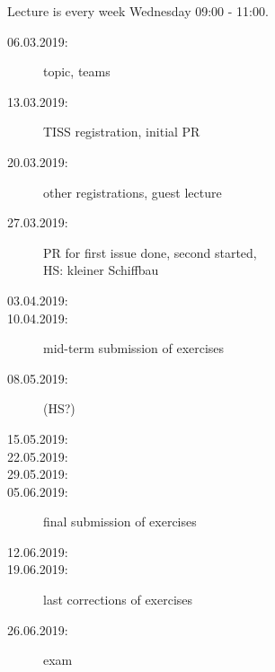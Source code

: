 

\date{20.3.2018}



\renewcommand{\enquote}[1]{\emph{``#1''}} %

\begin{frame}
	\titlepage
	\doclicenseThis
\end{frame}

\begin{frame}
	Lecture is every week Wednesday 09:00 - 11:00.

	\begin{description}
		\item[06.03.2019:] {\color{gray}topic, teams}
		\item[13.03.2019:] {\color{gray}TISS registration, initial PR}
		\item[20.03.2019:] {\color{red}other registrations, guest lecture}
		\item[27.03.2019:] {\color{orange}PR for first issue done, second started, \\ HS: kleiner Schiffbau}
		\item[03.04.2019:]
		\item[10.04.2019:] mid-term submission of exercises
		\item[08.05.2019:] (HS?)
		\item[15.05.2019:]
		\item[22.05.2019:]
		\item[29.05.2019:]
		\item[05.06.2019:] final submission of exercises
		\item[12.06.2019:]
		\item[19.06.2019:] last corrections of exercises
		\item[26.06.2019:] exam
	\end{description}
\end{frame}

